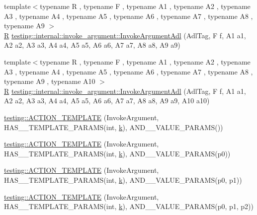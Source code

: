 \begin{DoxyCompactItemize}
{\footnotesize template$<$typename R , typename F , typename A1 , typename A2 , typename A3 , typename A4 , typename A5 , typename A6 , typename A7 , typename A8 , typename A9 $>$ }\\\hyperlink{typedefs__9_8js_afb423b73ee7b6c04d2d54fc06e405404}{R} \hyperlink{namespacetesting_1_1internal_1_1invoke__argument_a6e204965286414aac5113286eb5c8996}{testing\+::internal\+::invoke\+\_\+argument\+::\+Invoke\+Argument\+Adl} (Adl\+Tag, F f, A1 a1, A2 a2, A3 a3, A4 a4, A5 a5, A6 a6, A7 a7, A8 a8, A9 a9)
\item 
{\footnotesize template$<$typename R , typename F , typename A1 , typename A2 , typename A3 , typename A4 , typename A5 , typename A6 , typename A7 , typename A8 , typename A9 , typename A10 $>$ }\\\hyperlink{typedefs__9_8js_afb423b73ee7b6c04d2d54fc06e405404}{R} \hyperlink{namespacetesting_1_1internal_1_1invoke__argument_abd36164191a3e386c50243074854b272}{testing\+::internal\+::invoke\+\_\+argument\+::\+Invoke\+Argument\+Adl} (Adl\+Tag, F f, A1 a1, A2 a2, A3 a3, A4 a4, A5 a5, A6 a6, A7 a7, A8 a8, A9 a9, A10 a10)
\item 
\hyperlink{namespacetesting_a8a02397c7fdf8e84d559ab72dcc28eb1}{testing\+::\+A\+C\+T\+I\+O\+N\+\_\+\+T\+E\+M\+P\+L\+A\+TE} (Invoke\+Argument, H\+A\+S\+\_\+\_\+\+T\+E\+M\+P\+L\+A\+T\+E\+\_\+\+P\+A\+R\+A\+MS(int, \hyperlink{jquery_8js_ab26645c014aa005ecedef329ecf58c99}{k}), A\+N\+D\+\_\+\_\+\+V\+A\+L\+U\+E\+\_\+\+P\+A\+R\+A\+MS())
\item 
\hyperlink{namespacetesting_afaa0d88f5442f9aee5d6147377d3e50c}{testing\+::\+A\+C\+T\+I\+O\+N\+\_\+\+T\+E\+M\+P\+L\+A\+TE} (Invoke\+Argument, H\+A\+S\+\_\+\_\+\+T\+E\+M\+P\+L\+A\+T\+E\+\_\+\+P\+A\+R\+A\+MS(int, \hyperlink{jquery_8js_ab26645c014aa005ecedef329ecf58c99}{k}), A\+N\+D\+\_\+\_\+\+V\+A\+L\+U\+E\+\_\+\+P\+A\+R\+A\+MS(p0))
\item 
\hyperlink{namespacetesting_a39bf6c49dc1323cc9539a12249e60aba}{testing\+::\+A\+C\+T\+I\+O\+N\+\_\+\+T\+E\+M\+P\+L\+A\+TE} (Invoke\+Argument, H\+A\+S\+\_\+\_\+\+T\+E\+M\+P\+L\+A\+T\+E\+\_\+\+P\+A\+R\+A\+MS(int, \hyperlink{jquery_8js_ab26645c014aa005ecedef329ecf58c99}{k}), A\+N\+D\+\_\+\_\+\+V\+A\+L\+U\+E\+\_\+\+P\+A\+R\+A\+MS(p0, p1))
\item 
\hyperlink{namespacetesting_ac50647216fdf5197899a3d5034a9a670}{testing\+::\+A\+C\+T\+I\+O\+N\+\_\+\+T\+E\+M\+P\+L\+A\+TE} (Invoke\+Argument, H\+A\+S\+\_\+\_\+\+T\+E\+M\+P\+L\+A\+T\+E\+\_\+\+P\+A\+R\+A\+MS(int, \hyperlink{jquery_8js_ab26645c014aa005ecedef329ecf58c99}{k}), A\+N\+D\+\_\+\_\+\+V\+A\+L\+U\+E\+\_\+\+P\+A\+R\+A\+MS(p0, p1, p2))

\end{DoxyCompactItemize}

